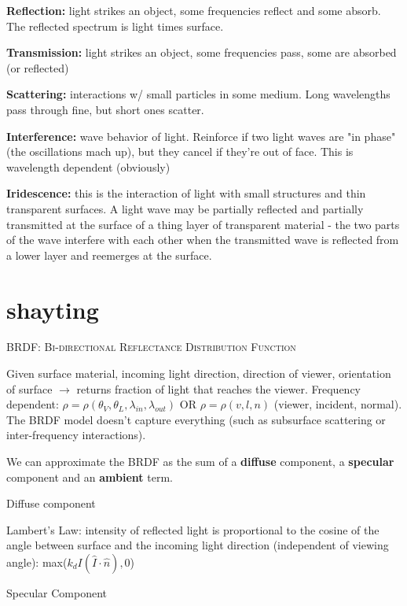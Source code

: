 \documentclass{article}
\begin{document}
{\bf Reflection:}  light strikes an object, some frequencies reflect and some absorb. The reflected spectrum is light times surface.

{\bf Transmission:}  light strikes an object, some frequencies pass, some are absorbed (or reflected)

{\bf Scattering:} interactions w/ small particles in some medium. Long wavelengths pass through fine, but short ones scatter.

{\bf Interference:} wave behavior of light. Reinforce if two light waves are "in phase" (the oscillations mach up), but they cancel if they're out of face. This is wavelength dependent (obviously)

{\bf Iridescence: } this is the interaction of light with small structures and thin transparent surfaces. A light wave may be partially reflected and partially transmitted at the surface of a thing layer of transparent material - the two parts of the wave interfere with each other when the transmitted wave is reflected from a lower layer and reemerges at the surface.
\section{shayting} %
\label{sec:shayting}

\begin{center}\textsc{BRDF: Bi-directional Reflectance Distribution Function}\end{center} 
Given surface material, incoming light direction, direction of viewer, orientation of surface $\rightarrow$ returns fraction of light that reaches the viewer. Frequency dependent: $\rho = \rho(\theta_V,\theta_L,\lambda_{in},\lambda_{out})$ OR $\rho = \rho(v,l,n)$ (viewer, incident, normal). The BRDF model doesn't capture everything (such as subsurface scattering or inter-frequency interactions). 

We can approximate the BRDF as the sum of a {\bf diffuse} component, a {\bf specular} component and an {\bf ambient} term.

\vspace{10pt}
Diffuse component

Lambert's Law: intensity of reflected light is proportional to the cosine of the angle between surface and the incoming light direction (independent of viewing angle): max($k_d I (\hat{I}\cdot \hat{n}),0$)

\vspace{10pt}
Specular Component
\end{document}
